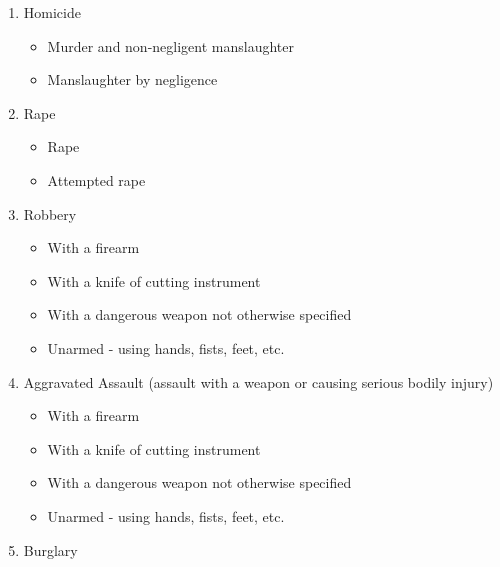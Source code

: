 \documentclass[
  12pt,
  openany]{book}
\providecommand{\tightlist}{%
  \setlength{\itemsep}{0pt}\setlength{\parskip}{0pt}}
\begin{document}
\begin{enumerate}
\def\labelenumi{\arabic{enumi}.}
\tightlist
\item
  Homicide

  \begin{itemize}
  \tightlist
  \item
    Murder and non-negligent manslaughter\\
  \item
    Manslaughter by negligence\\
  \end{itemize}
\item
  Rape

  \begin{itemize}
  \tightlist
  \item
    Rape\\
  \item
    Attempted rape\\
  \end{itemize}
\item
  Robbery

  \begin{itemize}
  \tightlist
  \item
    With a firearm\\
  \item
    With a knife of cutting instrument\\
  \item
    With a dangerous weapon not otherwise specified\\
  \item
    Unarmed - using hands, fists, feet, etc.\\
  \end{itemize}
\item
  Aggravated Assault (assault with a weapon or causing serious bodily injury)

  \begin{itemize}
  \tightlist
  \item
    With a firearm\\
  \item
    With a knife of cutting instrument\\
  \item
    With a dangerous weapon not otherwise specified\\
  \item
    Unarmed - using hands, fists, feet, etc.\\
  \end{itemize}
\item
  Burglary


\end{enumerate}
\end{document}
